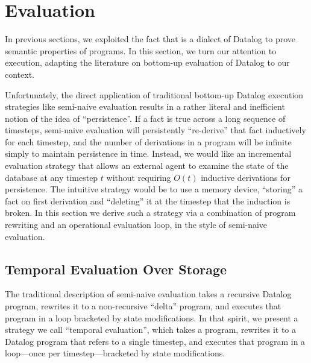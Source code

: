 \section{Evaluation}
In previous sections, we exploited the fact that \slang is a dialect of Datalog to prove semantic properties of \slang programs.  In this section, we turn our attention to execution, adapting the literature on bottom-up evaluation of Datalog to our context.

Unfortunately, the direct application of traditional bottom-up Datalog execution strategies like semi-naive evaluation results in a rather literal and inefficient notion of the idea of ``persistence''.  If a fact is true across a long sequence of timesteps, semi-naive evaluation will persistently ``re-derive'' that fact inductively for each timestep, and the number of derivations in a program will be infinite simply to maintain persistence in time.  Instead, we would like an incremental evaluation strategy that allows an external agent to examine the state of the database at any timestep $t$ without requiring $O(t)$ inductive derivations for persistence.  The intuitive strategy would be to use a memory device, ``storing'' a fact on first derivation and ``deleting'' it at the timestep that the induction is broken.  In this section we derive such a strategy via a combination of program rewriting and an operational evaluation loop, in the style of semi-naive evaluation.

\subsection{Temporal Evaluation Over Storage}
The traditional description of semi-naive evaluation takes a recursive Datalog program, rewrites it to a non-recursive ``delta'' program, and executes that program in a loop bracketed by state modifications.  In that spirit, we present a strategy we call ``temporal evaluation'', which takes a \slang program, rewrites it to a Datalog program that refers to a single timestep, and executes that program in a loop---once per timestep---bracketed by state modifications.  



